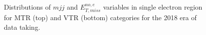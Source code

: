 \begin{figure}[htbp]
{    }
  \caption{Distributions of $mjj$ and $E_{T,miss}^{no,e}$ variables in single electron region for MTR (top) and VTR (bottom) categories for the 2018 era of data taking.}
  \label{fig:2018_Wenu_1}
\end{figure}


